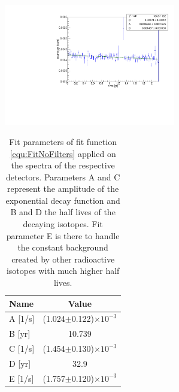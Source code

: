 \begin{table}[t!]
	\centering
	\begin{minipage}[t!]{.475\textwidth}
		\centering
		\ifmakefigures%
		\includegraphics[width=75mm]{./Bilder/doppelt.pdf}
		\label{fig:double}
	\end{minipage}\hfill%
	\begin{minipage}[t!]{.475\textwidth}
		\centering
		\begin{tabular}{|l|c|}
			\hline
			Name  & Value \\
			\hline
			A [1/s]    & (1.024$\pm$0.122)$\times 10^{-3}$ \\
			\hline
			B [yr] & 10.739 \\
			\hline
			C [1/s]  & (1.454$\pm$0.130)$\times 10^{-3}$ \\
			\hline
			D [yr] & 32.9 \\
			\hline
			E [1/s] & (1.757$\pm$0.120)$\times 10^{-3}$ \\
			\hline
		\end{tabular}
		\caption{
			Fit parameters of fit function \ref{equ:FitNoFilters} applied on the spectra of the respective detectors.
			Parameters A and C represent the amplitude of the exponential decay function and B and D the half lives of the decaying isotopes.
			Fit parameter E is there to handle the constant background created by other radioactive isotopes with much higher half lives.
		}
		\label{tab:doubleFitpara}
	\end{minipage}
\end{table}


